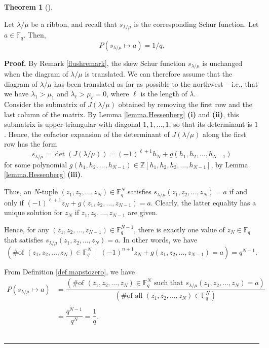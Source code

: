 \documentclass[numbers=enddot,12pt,final,onecolumn,notitlepage]{scrartcl}%
\theoremstyle{definition}
\newtheorem{theo}{Theorem}[section]
\newenvironment{theorem}[1][]
{\begin{theo}[#1]\begin{leftbar}}
{\end{leftbar}\end{theo}}
\newenvironment{proof}[1][Proof]{\noindent\textbf{#1.} }{\ \rule{0.5em}{0.5em}}
\newcommand{\tup}[1]{\left( #1 \right)}
\newcommand{\Fq}{\mathbb{F}_q}
\theoremstyle{plainsl}
\begin{document}


\begin{theorem}
\label{thm.ribbon}
Let $\lambda/\mu$ be a ribbon, and recall that $s_{\lambda/\mu}$ is the corresponding Schur function.
Let $a\in \Fq$.
Then,
\[
P(s_{\lambda/\mu} \mapsto a) = 1/q.
\]
\end{theorem}

\begin{proof}
By Remark \ref{flushremark}, the skew Schur function $s_{\lambda / \mu}$ is unchanged when the diagram of $\lambda / \mu$ is translated. We can therefore assume that the diagram of $\lambda / \mu$ has been translated as far as possible to the northwest -- i.e., that we have $\lambda_1> \mu_1$ and $\lambda_\ell > \mu_\ell =0$, where $\ell$ is the length of $\lambda$.\\

Consider the submatrix of $J(\lambda/\mu)$ obtained by removing the first row and the last column of the matrix.
By Lemma \ref{lemma.Hessenberg} \textbf{(i)} and \textbf{(ii)}, this submatrix is upper-triangular with diagonal $1, 1, \ldots, 1$, so that its determinant is $1$.
Hence, the cofactor expansion of the determinant of $J(\lambda/\mu)$ along the first row has the form
\[
 s_{\lambda / \mu } = \det(J(\lambda/\mu))= (-1)^{\ell+1} h_N + g( h_1, h_2, \ldots,h_{N-1})
\]
for some polynomial $g( h_1, h_2, \ldots,h_{N-1}) \in \mathbb{Z}\left[  h_{1},h_{2},h_{3},\ldots, h_{N-1}\right]$,
by Lemma \ref{lemma.Hessenberg} \textbf{(iii)}.

Thus, an $N$-tuple $\tup{z_1, z_2, \ldots, z_N} \in \Fq^N$
satisfies
$s_{\lambda / \mu } \tup{z_1, z_2, \ldots, z_{N}} = a$ if
and only if
$(-1)^{\ell+1} z_N + g( z_1, z_2, \ldots,z_{N-1}) = a$.
Clearly, the latter equality has a unique solution for $z_N$
if $z_1, z_2, \ldots, z_{N-1}$ are given.

Hence, for any $\tup{z_1, z_2, \ldots, z_{N-1}} \in \Fq^{N-1}$, there is
exactly one value of $z_N \in \Fq$ that satisfies
$s_{\lambda / \mu } \tup{z_1, z_2, \ldots, z_{N}} = a$.
In other words, we have
\[
\left(  \text{\# of }\left(  z_{1},z_{2},\ldots,z_{N}\right)  \in\Fq^{N}
\ \mid\ (-1)^{n+1} z_N + g( z_1, z_2, \ldots,z_{N-1}) =a\right)
= q^{N-1}.
\]

From Definition \ref{def.mapstozero}, we have
\begin{align*}
P\left(  s_{\lambda / \mu }\mapsto a\right)
&=\dfrac{\left(  \text{\# of }\left(  z_{1}%
,z_{2},\ldots,z_{N}\right)  \in\Fq^{N}\text{ such that } s_{\lambda / \mu } \left(
z_{1},z_{2},\ldots,z_{N}\right)  =a\right)  }{\left(  \text{\# of all }\left(
z_{1},z_{2},\ldots,z_{N}\right)  \in\Fq^{N}\right)  }\\
\\
&=\dfrac{q^{N-1}}{q^N} =\dfrac{1}{q} .
\end{align*}
\end{proof}





\printbibliography
\end{document}
